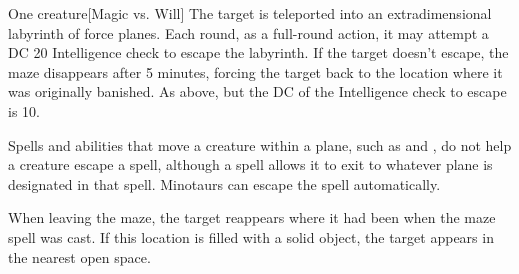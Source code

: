 \begin{spellheader}
    \spellrng{\rngmed}
\end{spellheader}
\begin{spelleffects}
    \begin{spelltarget}{One creature}[Magic vs. Will]
        \spellsuccess The target is teleported into an extradimensional labyrinth of force planes. Each round, as a full-round action, it may attempt a DC 20 Intelligence check to escape the labyrinth. If the target doesn't escape, the maze disappears after 5 minutes, forcing the target back to the location where it was originally banished.
        \spellfailure As above, but the DC of the Intelligence check to escape is 10.
    \end{spelltarget}
\end{spelleffects}
\begin{spellfooter}
    \spellnotes Spells and abilities that move a creature within a plane, such as  and , do not help a creature escape a  spell, although a  spell allows it to exit to whatever plane is designated in that spell. Minotaurs can escape the spell automatically.

    When leaving the maze, the target reappears where it had been when the maze spell was cast. If this location is filled with a solid object, the target appears in the nearest open space.

    \norepeatspellnotes
\end{spellfooter}

